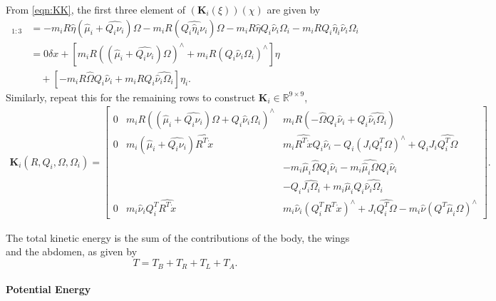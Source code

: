 \documentclass[10pt]{article}
\renewcommand{\Re}{\ensuremath{\mathbb{R}}}
\begin{document}
From \eqref{eqn:KK}, the first three element of $(\mathbf{K}_i(\xi)) (\chi)$ are given by
\begin{align*}
    [ (\mathbf{K}_i(\xi)) (\chi) ]_{1:3} & = 
     - m_i R\hat\eta (\hat\mu_i + \widehat{Q_i\nu_i}) \Omega 
     - m_i R( \widehat{Q_i\hat\eta_i\nu_i}) \Omega
     - m_i R\hat\eta Q_i \hat\nu_i\Omega_i
     - m_i R Q_i\hat\eta_i \hat\nu_i\Omega_i\\
                                         & = 0 \delta x +  [m_i R ((\hat\mu_i + \widehat{Q_i\nu_i}) \Omega)^\wedge + m_i R (Q_i\hat\nu_i\Omega_i)^\wedge ] \eta \\
                                         & \quad +
                                         [   - m_i R\hat\Omega Q_i\hat\nu_i
                                        + m_i R Q_i \widehat{\hat\nu_i \Omega_i} ] \eta_i.
\end{align*}
Similarly, repeat this for the remaining rows to construct 
$\mathbf{K}_i\in\Re^{9\times 9}$,
\begin{align}
    \mathbf{K}_i(R,Q_i,\Omega,\Omega_i) = 
    \begin{bmatrix}
        0 & m_i R ((\hat\mu_i+\widehat{Q_i\nu_i})\Omega + Q_i\hat\nu_i\Omega_i)^\wedge 
          & m_i R( -\hat\Omega Q_i \hat\nu_i + Q_i \widehat{\hat \nu_i \Omega_i}) \\
        0 & m_i(\hat\mu_i + \widehat{Q_i\nu_i})\widehat{R^T \dot x}
        & m_i\widehat{R^T\dot x}Q_i\hat\nu_i - Q_i (J_iQ_i^T\Omega)^\wedge + Q_i J_i \widehat{Q_i^T\Omega} \\
        & & - m_i\hat\mu_i\hat\Omega Q_i\hat\nu_i - m_i\widehat{\hat\mu_i\Omega} Q_i \hat\nu_i \\
        & & - Q_i \widehat{J_i\Omega_i} + m_i \hat\mu_i Q_i \widehat{\hat\nu_i \Omega_i} \\
        0 & m_i \hat\nu_i Q_i^T \widehat{R^T\dot x}
        & m_i \hat\nu_i (Q_i^T R^T \dot x)^\wedge + J_i\widehat{Q_i^T\Omega} - m_i\hat\nu (Q^T\hat\mu_i \Omega)^\wedge
    \end{bmatrix}.
\end{align}


The total kinetic energy is the sum of the contributions of the body, the wings and the abdomen, as given by
\[
    T = T_B + T_R + T_L + T_A.
\]

\paragraph{Potential Energy}
\end{document}
